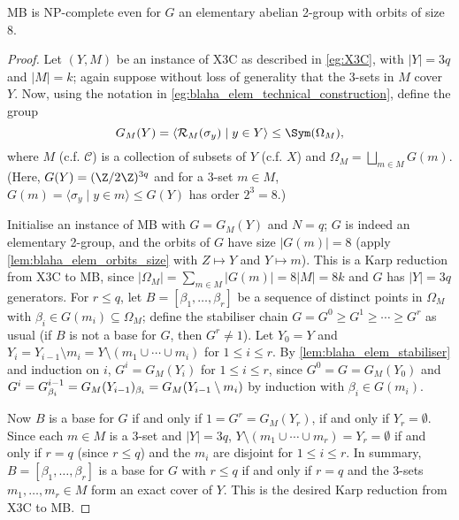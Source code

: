 
\begin{theorem}[Blaha, 1992]\label{thm:blaha_elem_NP_complete}
    MB is NP-complete even for $G$ an elementary abelian 2-group with orbits of size 8.
\end{theorem}

\begin{proof}
    Let $(Y,M)$ be an instance of X3C as described in \autoref{eg:X3C}, with $|Y| = 3q$ and $|M| = k$; again suppose without loss of generality that the 3-sets in $M$ cover $Y$. Now, using the notation in \autoref{eg:blaha_elem_technical_construction}, define the group
    $$G_M(Y) = \langle \mathcal{R}_M(\sigma_y) \mid y \in Y \rangle \leq \Sym(\Omega_M),$$ where $M$ (c.f. $\mathcal{C}$) is a collection of subsets of $Y$ (c.f. $X$) and $\Omega_M = \bigsqcup_{m \in M} G(m)$. (Here, $G(Y) = (\Z/2\Z)^{3q}$ and for a 3-set $m \in M$, $G(m) = \langle \sigma_y \mid y \in m \rangle \leq G(Y)$ has order $2^3 = 8$.)

    Initialise an instance of MB with $G = G_M(Y)$ and $N = q$; $G$ is indeed an elementary  2-group, and the orbits of $G$ have size $|G(m)| = 8$ (apply \autoref{lem:blaha_elem_orbits_size} with $Z \mapsto Y$ and $Y \mapsto m$). This is a Karp reduction from X3C to MB, since $|\Omega_M| = \sum_{m \in M} |G(m)| = 8|M| = 8k$ and $G$ has $|Y| = 3q$ generators. For $r \leq q$, let $B = [\beta_1,\dotsc,\beta_r]$ be a sequence of distinct points in $\Omega_M$ with $\beta_i \in G(m_i) \subseteq \Omega_M$; define the stabiliser chain $G = G^0 \geq G^1 \geq \dotsb \geq G^r$ as usual (if $B$ is not a base for $G$, then $G^r \neq 1$). Let $Y_0 = Y$ and $Y_i = Y_{i-1} \setminus m_i = Y \setminus (m_1 \cup \dotsb \cup m_i)$ for $1 \leq i \leq r$. By \autoref{lem:blaha_elem_stabiliser} and induction on $i$, $G^i = G_M(Y_i)$ for $1 \leq i \leq r$, since $G^0 = G = G_M(Y_0)$ and $G^i = \added{2}{G^{i-1}_{\beta_i}} = \added{2}{G_M(Y_{i-1})_{\beta_i}} = G_M(Y_{i-1} \setminus m_i)$ by induction with $\beta_i \in G(m_i)$.

    Now $B$ is a base for $G$ if and only if $1 = G^r = G_M(Y_r)$, if and only if $Y_r = \emptyset$. Since each $m \in M$ is a 3-set and $|Y| = 3q$, $Y \setminus (m_1 \cup \dotsb \cup m_r) = Y_r = \emptyset$ if and only if $r = q$ (since $r \leq q$) and the $m_i$ are disjoint for $1 \leq i \leq r$. In summary, $B = [\beta_1,\dotsc,\beta_r]$ is a base for $G$ with $r \leq q$ if and only if $r = q$ and the 3-sets $m_1,\dotsc,m_r \in M$ form an exact cover of $Y$. This is the desired Karp reduction from X3C to MB.
\end{proof}

